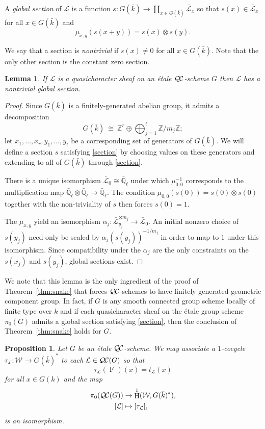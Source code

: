 \documentclass{amsart}
\theoremstyle{plain}
\newtheorem{proposition}[theorem]{Proposition}
\newtheorem{lemma}[theorem]{Lemma}
\theoremstyle{definition}
\theoremstyle{remark}
\newcommand{\ZZ}{{\mathbb{Z}}}
\newcommand{\EE}{\mathbb{\bar Q}_\ell}
\newcommand{\bFq}{\bar{k}}
\newcommand{\Fq}{k}
\newcommand{\Weil}[1]{\mathcal{W}_{#1}}
\newcommand{\Frob}[1]{\operatorname{F}_{#1}}
\DeclareMathOperator{\Hh}{H}
\newcommand{\iso}{{\ \cong\ }}
\newcommand{\qcs}[1]{{\mathcal{#1}}}
\newcommand{\gqcs}[1]{{\mathcal{\bar #1}}}
\newcommand{\QC}{{\mathcal{Q\hskip-0.8pt C}}}
\newcommand{\QCiso}[1]{\pi_0 (\QC(#1))}
\newcommand{\trFrob}[1]{t_{#1}}
\begin{document}
A \emph{global section} of $\qcs{L}$ is a function $s : G(\bFq) \to \coprod_{x \in G(\bFq)} \gqcs{L}_x$
so that $s(x) \in \gqcs{L}_x$ for all $x \in G(\bFq)$ and
\begin{equation}\label{section}
\mu_{x,y}(s(x+y)) = s(x) \otimes s(y).
\end{equation}

We say that a section is \emph{nontrivial} if $s(x) \ne 0$ for all $x \in G(\bFq)$. 
Note that the only other section is the constant zero section.

\begin{lemma}\label{lemma:section}
 If $\qcs{L}$ is a quasicharacter sheaf on an \'etale $\QC$-scheme $G$ then $\qcs{L}$ has a nontrivial global section.
\end{lemma}

\begin{proof}
  Since $G(\bFq)$ is a finitely-generated abelian group, it admits a decomposition
  \[
  G(\bFq) \iso \ZZ^r \oplus \bigoplus_{j=1}^t \ZZ / m_j \ZZ;
  \]
  let $x_1, \ldots, x_r, y_1, \ldots, y_t$ be a corresponding set of generators of $G(\bFq)$.
  We will define a section $s$ satisfying \eqref{section} by choosing values on these generators and extending to all
  of $G(\bFq)$ through \eqref{section}.
  
  There is a unique isomorphism $\gqcs{L}_0 \cong \EE$ under which $\mu_{0,0}^{-1}$ corresponds
  to the multiplication map $\EE \otimes\EE \to \EE$.
  The condition $\mu_{0,0}(s(0)) = s(0) \otimes s(0)$ together with the non-triviality of $s$
  then forces $s(0) = 1$.
  
  The $\mu_{x,y}$ yield an isomorphism $\alpha_j : \gqcs{L}_{y_j}^{\otimes m_j} \to \gqcs{L}_0$.
  An initial nonzero choice of $s(y_j)$ need only be scaled by $\alpha_j(s(y_j))^{-1/m_j}$ in order to map to
  $1$ under this isomorphism.  Since compatibility under the $\alpha_j$ are the only constraints on the
  $s(x_j)$ and $s(y_j)$, global sections exist.
\end{proof}

We note that this lemma is the only ingredient of the proof of Theorem~\ref{thm:snake}
that forces $\QC$-schemes to have finitely generated geometric component group.  In fact,
if $G$ is any smooth connected group scheme locally of finite type over $\Fq$
and if each quasicharacter sheaf on the \'etale group scheme $\pi_0(G)$ admits a global section 
satisfying \eqref{section}, then the conclusion of Theorem~\ref{thm:snake} holds for $G$.

\begin{proposition}\label{prop:etale}
  Let $G$ be an \'etale $\QC$-scheme.
  We may associate a $1$-cocycle $\tau_\qcs{L}: \Weil{}\to G(\bFq)^*$ to each $\qcs{L} \in \QC(G)$
  so that
  \[
  \tau_\qcs{L}(\Frob{})(x) = \trFrob{\qcs{L}}(x)
  \]
  for all $x \in G(\Fq)$ and the map
  \begin{align*}
  \QCiso{G} &\to \Hh^1(\Weil{}, G(\bFq)^*), \\
  [\qcs{L}] &\mapsto [\tau_\qcs{L}],
  \end{align*}
  is an isomorphism.
\end{proposition}
\end{document}
